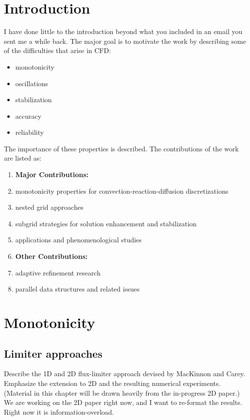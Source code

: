 \documentclass[12pt,pdftex]{article}
\begin{document}
\begin{spacing}{1.5}

  
\section{Introduction}
I have done little to the introduction beyond what you included in an
email you sent me a while back.  The major goal is to motivate the
work by describing some of the difficulties that arise in CFD:
\begin{itemize}
  \item monotonicity
  \item oscillations
  \item stabilization
  \item accuracy
  \item reliability
\end{itemize}

The importance of these properties is described.  The contributions of
the work are listed as:
\begin{enumerate}
  \item[] \textbf{Major Contributions:}
    
  \item monotonicity properties for convection-reaction-diffusion
  discretizations
  
  \item nested grid approaches
    
  \item subgrid strategies for solution enhancement and stabilization
    
  \item applications and phenomenological studies

  \item[] \textbf{Other Contributions:}
    
  \item adaptive refinement research
    
  \item parallel data structures and related issues
\end{enumerate}


\section{Monotonicity}
\subsection{Limiter approaches}
Describe the 1D and 2D flux-limiter approach devised by MacKinnon and
Carey.  Emphasize the extension to 2D and the resulting numerical
experiments.  (Material in this chapter will be drawn heavily from the
in-progress 2D paper.)  We are working on the 2D paper right now, and
I want to re-format the results.  Right now it is information-overload.


\end{spacing}
\end{document}
